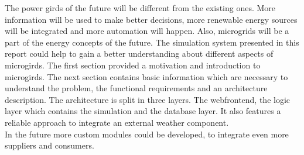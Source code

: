 The power girds of the future will be different from the existing ones. More information will be used to make better decisions, more renewable energy sources will be integrated and more automation will happen. Also, microgrids will be a part of the energy concepts of the future. The simulation system presented in this report could help to gain a better understanding about different aspects of microgirds. The first section provided a motivation and introduction to microgirds. The next section contains basic information which are necessary to understand the problem, the functional requirements and an architecture description. The architecture is split in three layers. The webfrontend, the logic layer which contains the simulation and the database layer. It also features a reliable approach to integrate an external weather component.\\

\noindent In the future more custom modules could be developed, to integrate even more suppliers and consumers.
